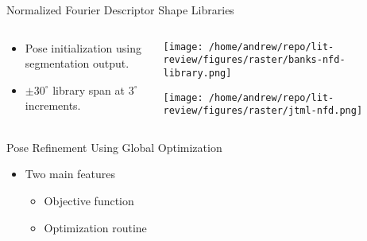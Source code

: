 \documentclass[presentation, aspectratio=1610]{beamer}
\begin{document}
\begin{frame}[label={sec:org2655113}]{Normalized Fourier Descriptor Shape Libraries}
\begin{columns}
\begin{column}{0.37\columnwidth}
\begin{itemize}
\item Pose initialization using segmentation output.
\item \(\pm 30^{\circ}\) library span at \(3^{\circ}\) increments.
\end{itemize}
\end{column}

\begin{column}{0.7\columnwidth}
\begin{center}
\texttt{[image: /home/andrew/repo/lit-review/figures/raster/banks-nfd-library.png]}
\end{center}
\begin{center}
\texttt{[image: /home/andrew/repo/lit-review/figures/raster/jtml-nfd.png]}
\end{center}
\end{column}
\end{columns}
\end{frame}
\begin{frame}[label={sec:org1d27ac7}]{Pose Refinement Using Global Optimization}
\begin{itemize}
\item Two main features
\begin{itemize}
\item Objective function
\item Optimization routine
\end{itemize}
\end{itemize}
\end{frame}
\end{document}
